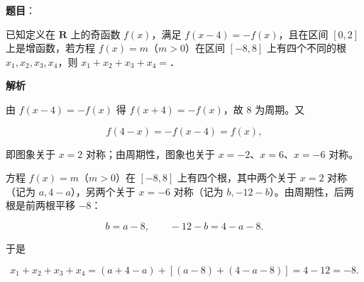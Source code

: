 \begin{answer}

\textbf{题目}：

已知定义在 $\mathbf R$ 上的奇函数 $f(x)$，满足 $f(x-4)=-f(x)$，且在区间 $[0,2]$ 上是增函数，若方程 $f(x)=m$（$m>0$）在区间 $[-8,8]$ 上有四个不同的根 $x_1,x_2,x_3,x_4$，则 $x_1+x_2+x_3+x_4=$\gkblank{}．

\textbf{解析}

由 $f(x-4)=-f(x)$ 得 $f(x+4)=-f(x)$，故 $8$ 为周期。又

\nopagebreak[4]
\[f(4-x)=-f(x-4)=f(x),\]

即图象关于 $x=2$ 对称；由周期性，图象也关于 $x=-2$、$x=6$、$x=-6$ 对称。

方程 $f(x)=m$（$m>0$）在 $[-8,8]$ 上有四个根，其中两个关于 $x=2$ 对称（记为 $a,4-a$），另两个关于 $x=-6$ 对称（记为 $b,-12-b$）。由周期性，后两根是前两根平移 $-8$：

\nopagebreak[4]
\[b=a-8,\qquad -12-b=4-a-8 .\]

于是

\nopagebreak[4]
\[x_1+x_2+x_3+x_4=(a+4-a)+[(a-8)+(4-a-8)]=4-12=-8 .\]


\end{answer}
